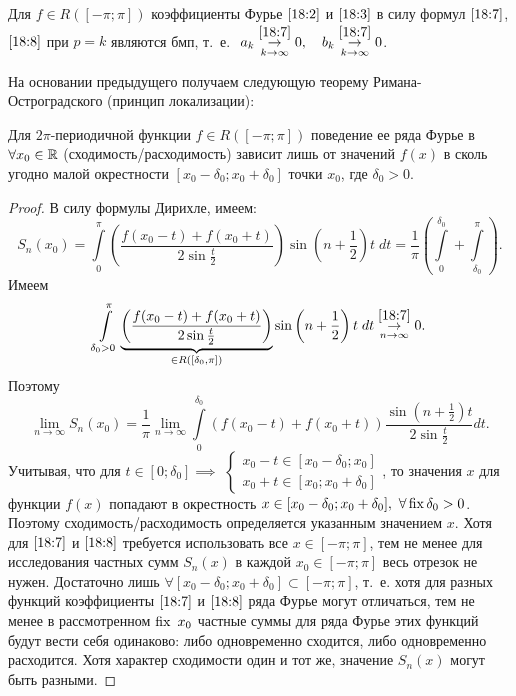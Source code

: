 \documentclass[../../main.tex]{subfiles}
\begin{document}
\begin{crl*}
	Для $f \in R([-\pi; \pi])$ коэффициенты Фурье $\eqref{18:2}$ и
	$\eqref{18:3}$ в силу формул $\eqref{18:7}$, $\eqref{18:8}$ при
	$p=k$ являются бмп, т.~е.
	$\ a_k \overset{\eqref{18:7}}{\underset
		{k \rightarrow \infty}{\rightarrow}} 0, \quad
	b_k \overset{\eqref{18:7}}{\underset
		{k \rightarrow \infty}{\rightarrow}} 0$.
\end{crl*}

\begin{rem}
	На основании предыдущего получаем следующую теорему 
	Римана-Остроградского (принцип локализации):
\end{rem}

\begin{thm}
	Для $2\pi$-периодичной функции $f\in R([-\pi;\pi])$ поведение
	ее ряда Фурье в $\forall x_0 \in \mathbb{R}$ (сходимость/расходимость) зависит
	лишь от значений $f(x)$ в сколь угодно малой окрестности
	$[x_0 - \delta_0; x_0 + \delta_0]$ точки $x_0$, где $\delta_0 > 0$.
\end{thm}

\begin{proof}
	В силу формулы Дирихле, имеем:
	\[S_n(x_0) = 
	\int\limits_{0}^{\pi}\left(\dfrac{f(x_0 - t) + f(x_0 + t)}
	{2\sin{\frac{t}{2}}}\right)\sin\left(n+\frac{1}{2}\right)t\;dt = 
	\dfrac{1}{\pi}\left(\int\limits_{0}^{\delta_0} + 
	\int\limits_{\delta_0}^{\pi}\right).\]
	Имеем
	\[\int\limits_{\delta_0 > 0}^{\pi} \underbrace{\left(\dfrac{f(x_0 - t) + f(x_0 + t)}
	{2\sin{\frac{t}{2}}}\right)}_{\in R([\delta_0, \pi])} \sin\left(n+\frac{1}{2}\right)t\;dt 
	 \overset{\eqref{18:7}}{\underset
		{n \rightarrow \infty}{\rightarrow}} 0.\]
	Поэтому
	\[\lim\limits_{n \rightarrow \infty}{S_n(x_0)} = \dfrac{1}{\pi}
	\lim\limits_{n \rightarrow \infty}{\int\limits_{0}^{\delta_0}
	(f(x_0 - t) + f(x_0 + t)) \dfrac{\sin(n+\frac{1}{2})t}{
	2\sin\frac{t}{2}}}dt.\]
	Учитывая, что для $t \in [0; \delta_0 ] \implies$
	$\begin{cases}
		x_0 - t \in [x_0 - \delta_0; x_0] 
		\\
		x_0 + t \in [x_0; x_0 + \delta_0] 
	\end{cases}$,
	то значения $x$ для функции $f(x)$
	попадают в окрестность
	 $x \in [x_0 - \delta_0; x_0 + \delta_0],\ \forall \operatorname{fix} \delta_0 > 0$.
	 Поэтому сходимость/расходимость определяется указанным значением $x$.
	 Хотя для $\eqref{18:7}$ и $\eqref{18:8}$ требуется использовать все
	 $x \in [-\pi; \pi]$, тем не менее для исследования частных сумм 
	 $S_n(x)$ в каждой $x_0 \in [-\pi; \pi]$ весь отрезок не нужен.
	 Достаточно лишь $\forall [x_0 - \delta_0; x_0 + \delta_0] \subset
	 [-\pi; \pi]$, т.~е. хотя для разных функций коэффициенты 
	 $\eqref{18:7}$ и $\eqref{18:8}$ ряда Фурье могут отличаться, 
	 тем не менее в рассмотренном $\operatorname{fix}\ x_0$ частные суммы для
	 ряда Фурье
	 этих функций будут вести себя одинаково: либо одновременно сходится, 
	 либо одновременно расходится.
	 Хотя характер сходимости один и тот же, значение $S_n(x)$ могут быть
	 разными.
\end{proof}
\end{document}
